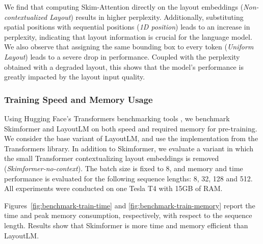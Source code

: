 We find that computing Skim-Attention directly on the layout embeddings (\textit{Non-contextualized Layout}) results in higher perplexity. Additionally, substituting spatial positions with sequential positions (\textit{1D position}) leads to an increase in perplexity, indicating that layout information is crucial for the language model. We also observe that assigning the same bounding box to every token (\textit{Uniform Layout}) leads to a severe drop in performance. Coupled with the perplexity obtained with a degraded layout, this shows that the model's performance is greatly impacted by the layout input quality. 

\subsubsection{Training Speed and Memory Usage}
\label{subsubsection:training-speed-memory-usage}

Using Hugging Face's Transformers benchmarking tools \citep{wolf2019huggingface}, we benchmark Skimformer and LayoutLM on both speed and required memory for pre-training. We consider the base variant of LayoutLM, and use the implementation from the Transformers library. In addition to Skimformer, we evaluate a variant in which the small Transformer contextualizing layout embeddings is removed (\textit{Skimformer-no-context}). The batch size is fixed to 8, and memory and time performance is evaluated for the following sequence lengths: 8, 32, 128 and 512. All experiments were conducted on one Tesla T4 with 15GB of RAM.


Figures~\ref{fig:benchmark-train-time} and \ref{fig:benchmark-train-memory} report the time and peak memory consumption, respectively, with respect to the sequence length. Results show that Skimformer is more time and memory efficient than LayoutLM. 

